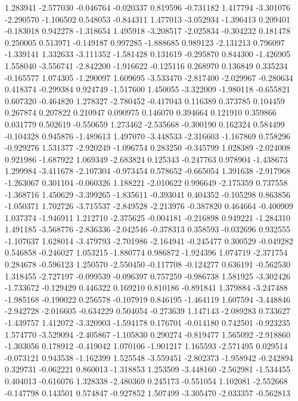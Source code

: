 1.283941
-2.577030
-0.046764
-0.020337
0.819596
-0.731182
1.417794
-3.301076
-2.290570
-1.106502
0.548053
-0.844311
1.477013
-3.052934
-1.396413
0.209401
-0.183018
0.942278
-1.318654
1.495918
-3.208517
-2.025834
-0.304232
0.181478
0.250005
0.513971
-0.149187
0.997285
-1.888685
0.989123
-2.131213
0.796097
-1.339141
1.332633
-3.111352
-1.581428
0.131619
-0.295870
0.844300
-1.426905
1.558040
-3.556741
-2.842200
-1.916622
-0.125116
0.268970
0.136849
0.335234
-0.165577
1.074305
-1.290097
1.609695
-3.533470
-2.817400
-2.029967
-0.280634
0.418374
-0.299384
0.924749
-1.517600
1.450055
-3.322009
-1.980118
-0.655821
0.607320
-0.464820
1.278327
-2.780452
-0.417043
0.116389
0.373785
0.104459
0.267874
0.207822
0.210947
0.090975
0.146070
0.394664
0.121910
0.359866
0.031779
0.502619
-0.550659
1.273462
-2.535668
-0.300190
0.162324
0.584499
-0.104328
0.945876
-1.489613
1.497070
-3.448533
-2.316603
-1.167869
0.758296
-0.929276
1.531377
-2.920249
-1.096754
0.283250
-0.345799
1.028389
-2.024008
0.921986
-1.687922
1.069349
-2.683824
0.125343
-0.247763
0.978904
-1.438673
1.299984
-3.411678
-2.107304
-0.973454
0.578652
-0.665054
1.391638
-2.917968
-1.263067
0.301104
-0.060326
1.188221
-2.010622
0.996649
-2.175359
0.737558
-1.368716
1.450629
-3.399265
-1.835611
-0.393041
0.404352
-0.105298
0.863856
-1.050371
1.702726
-3.715537
-2.849528
-2.213976
-0.387820
0.464664
-0.400909
1.037374
-1.946911
1.212710
-2.375625
-0.004181
-0.216898
0.949221
-1.284310
1.491185
-3.568776
-2.836336
-2.042546
-0.378313
0.358593
-0.032696
0.932555
-1.107637
1.628014
-3.479793
-2.701986
-2.164941
-0.245477
0.300529
-0.049282
0.546858
-0.246027
1.053215
-1.880774
0.986872
-1.924396
1.074719
-2.371754
0.284678
-0.596123
1.250570
-2.550450
-0.117708
-0.124277
0.636191
-0.562530
1.318455
-2.727197
-0.099539
-0.096397
0.757259
-0.986738
1.581925
-3.302426
-1.733672
-0.129429
0.446322
0.169210
0.810186
-0.891841
1.379884
-3.247488
-1.985168
-0.190022
0.256578
-0.107919
0.846195
-1.464119
1.607594
-3.448846
-2.942728
-2.016605
-0.634229
0.504054
-0.273639
1.147143
-2.089283
0.733627
-1.439757
1.412072
-3.320903
-1.594178
0.176701
-0.014180
0.742501
-0.923235
1.574770
-3.529094
-2.405867
-1.105830
0.290274
-0.819477
1.565092
-2.918860
-1.303056
0.178912
-0.419042
1.070106
-1.901217
1.165593
-2.571495
0.029514
-0.073121
0.943538
-1.162399
1.525548
-3.559451
-2.802373
-1.958942
-0.242894
0.329731
-0.062221
0.860013
-1.318853
1.253509
-3.448160
-2.562981
-1.534455
0.404013
-0.616076
1.328338
-2.480369
0.245173
-0.551054
1.102081
-2.552668
-0.147798
0.143501
0.574847
-0.927852
1.507499
-3.305470
-2.033357
-0.562813
